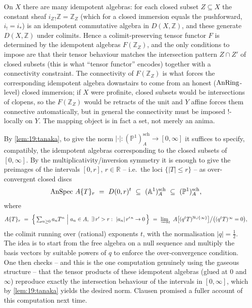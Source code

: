 \begin{remark}
\label{rmk:19:tanaka-reading}
On $X$ there are many idempotent algebras: for each closed subset $Z\subseteq X$
the constant sheaf $i_{Z\,!}\mathbb Z=\mathbb Z_Z$ (which for a closed immersion
equals the pushforward, $i_!=i_*$) is an idempotent commutative algebra in
$D(X,\mathbb Z)$, and these generate $D(X,\mathbb Z)$ under colimits. Hence a
colimit-preserving tensor functor $F$ is determined by the idempotent algebras
$F(\mathbb Z_Z)$, and the only conditions to impose are that their tensor
behaviour matches the intersection pattern $Z\cap Z'$ of closed subsets (this is
what ``tensor functor'' encodes) together with a connectivity constraint. The
connectivity of $F(\mathbb Z_Z)$ is what forces the corresponding idempotent
algebra downstairs to come from an honest ($\operatorname{AnRing}$-level) closed immersion; if
$X$ were profinite, closed subsets would be intersections of clopens, so the
$F(\mathbb Z_Z)$ would be retracts of the unit and $Y$ affine forces them
connective automatically, but in general the connectivity must be imposed
$!$-locally on $Y$. The mapping object is in fact a set, not merely an anima.
\end{remark}

\begin{remark}
\label{rmk:19:norm-construction}
By \cref{lem:19:tanaka}, to give the norm
$|\cdot|\colon(\mathbb P^1)^{\mathrm{sch}}_A\to[0,\infty]$ it suffices to specify,
compatibly, the idempotent algebras corresponding to the closed subsets of
$[0,\infty]$. By the multiplicativity/inversion symmetry it is enough to give the
preimages of the intervals $[0,r]$, $r\in\mathbb R$ -- i.e.\ the loci $\{|T|\le r\}$
-- as over-convergent closed discs
\begin{equation*}
\AnSpec\,A\{T\}_r\ =\ D(0,r)^{t}\ \subseteq\ (\mathbb A^1)^{\mathrm{sch}}_A
\ \subseteq\ (\mathbb P^1)^{\mathrm{sch}}_A,
\end{equation*}
where
\begin{equation*}
A\{T\}_r\ =\ \Bigl\{\,\textstyle\sum_{n\ge0} a_n T^{n}\ \Big|\ a_n\in A,\
\exists\, r'>r:\ |a_n|\,r'^{\,n}\to0\,\Bigr\}
\ =\ \varinjlim_{t}\ A\bigl[(q^{t}T)^{\mathbb N\cup\{\infty\}}\bigr]\big/\bigl((q^{t}T)^{\infty}=0\bigr),
\end{equation*}
the colimit running over (rational) exponents $t$, with the normalisation
$|q|=\tfrac12$. The idea is to start from the free algebra on a null sequence and
multiply the basis vectors by suitable powers of $q$ to enforce the
over-convergence condition. One then checks -- and this is the one computation
genuinely using the gaseous structure -- that the tensor products of these
idempotent algebras (glued at $0$ and $\infty$) reproduce exactly the intersection
behaviour of the intervals in $[0,\infty]$, which by \cref{lem:19:tanaka} yields
the desired norm. Clausen promised a fuller account of this computation next time.
\end{remark}

